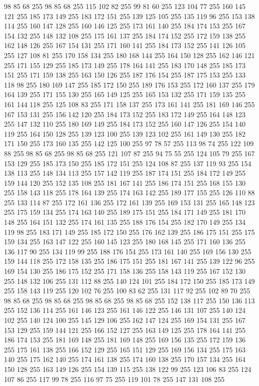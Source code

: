 98 85 68 255 98 85 68 255 115 102 82 255 99 81 60 255 123 104 77 255 160 145 121 255 185 173 149 255 183 172 151 255 139 125 105 255 135 119 96 255 153 138 114 255 160 147 128 255 160 146 125 255 173 161 140 255 184 174 153 255 167 154 132 255 148 132 108 255 175 161 137 255 184 174 152 255 172 159 138 255 162 148 126 255 167 154 131 255 171 160 141 255 184 173 152 255 141 126 105 255 127 108 81 255 170 158 134 255 180 168 144 255 164 150 128 255 162 146 121 255 171 155 129 255 185 173 149 255 178 164 141 255 183 170 148 255 185 173 151 255 171 159 138 255 163 150 126 255 187 176 154 255 187 175 153 255 133 118 98 255 180 169 147 255 185 172 150 255 189 176 153 255 172 160 137 255 179 164 139 255 171 155 130 255 165 149 125 255 165 153 132 255 171 159 135 255 161 144 118 255 125 108 83 255 171 158 137 255 173 161 141 255 181 169 146 255 167 153 131 255 156 142 120 255 184 173 152 255 183 172 149 255 164 148 123 255 147 132 110 255 180 169 149 255 184 173 152 255 160 147 126 255 154 140 119 255
164 150 128 255 139 123 100 255 139 123 102 255 161 149 130 255 182 171 150 255 173 160 135 255 142 125 100 255 97 78 57 255 113 98 74 255 122 109 88 255 98 85 68 255 98 85 68 255 121 107 87 255 94 75 55 255 124 105 79 255 167 153 129 255 185 173 150 255 185 172 151 255 124 108 87 255 137 119 93 255 154 138 113 255 148 134 113 255 157 142 119 255 187 174 151 255 184 172 149 255 159 144 120 255 152 135 108 255 181 167 141 255 186 174 151 255 168 155 130 255 158 143 118 255 178 164 139 255 174 163 142 255 189 177 155 255 126 110 88 255 133 114 87 255 172 161 136 255 172 161 139 255 169 153 131 255 165 148 123 255 175 159 134 255 174 163 140 255 189 175 151 255 184 171 149 255 181 170 148 255 164 151 132 255 174 161 135 255 188 176 154 255 182 170 149 255 134 119 98 255 183 171 149 255 185 172 150 255 176 162 139 255 186 175 151 255 175 159 134 255 163 147 122 255 160 145 123 255 180 168 145 255 171 160 136 255 136 117 90 255 134 119 99 255 188 176 154 255 173 161 140 255 169 156 130 255
159 144 118 255 172 158 135 255 186 175 151 255 181 167 141 255 139 122 96 255 169 154 130 255 186 175 152 255 171 158 136 255 158 143 119 255 167 152 130 255 148 132 106 255 131 112 88 255 140 124 101 255 184 172 150 255 185 173 149 255 158 143 119 255 120 102 76 255 100 83 62 255 131 117 92 255 102 89 70 255 98 85 68 255 98 85 68 255 98 85 68 255 98 85 68 255 152 138 117 255 150 136 113 255 152 136 114 255 161 146 123 255 161 146 122 255 146 131 107 255 140 124 102 255 140 124 100 255 145 129 106 255 162 147 124 255 169 154 131 255 167 153 129 255 159 144 121 255 166 152 127 255 163 149 125 255 178 164 141 255 186 174 153 255 181 169 148 255 181 169 148 255 169 156 135 255 172 159 136 255 175 161 138 255 166 152 129 255 165 151 129 255 169 156 134 255 175 163 140 255 175 162 140 255 174 161 138 255 174 160 138 255 170 157 134 255 164 150 128 255 163 149 126 255 154 139 115 255 138 122 99 255 123 106 83 255 124 107 86 255 117 99 78 255 116 97 75 255 119 101 78 255 147 131 108 255
